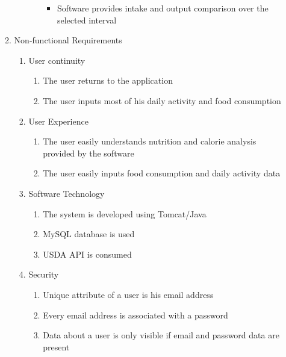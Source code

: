 \begin{enumerate}
\begin{enumerate}
\begin{enumerate}
\begin{enumerate}
\begin{itemize}
			\item Software provides intake and output comparison over the selected interval
			\end{itemize}
		\end{enumerate}
		\end{enumerate}
	\item Non-functional Requirements
		\begin{enumerate}
		\item User continuity
			\begin{enumerate}
			\item The user returns to the application
			\item The user inputs most of his daily activity and food consumption
			\end{enumerate}
		\item User Experience
			\begin{enumerate}
			\item The user easily understands nutrition and calorie analysis provided by the software
			\item The user easily inputs food consumption and daily activity data
			\end{enumerate}
		\item Software Technology
			\begin{enumerate}
			\item The system is developed using Tomcat/Java
			\item MySQL database is used
			\item USDA API is consumed
			\end{enumerate}
		\item Security
			\begin{enumerate}
			\item Unique attribute of a user is his email address
			\item Every email address is associated with a password
			\item Data about a user is only visible if email and password data are present
			\end{enumerate}
		\end{enumerate}
	\end{enumerate}
\end{enumerate}
